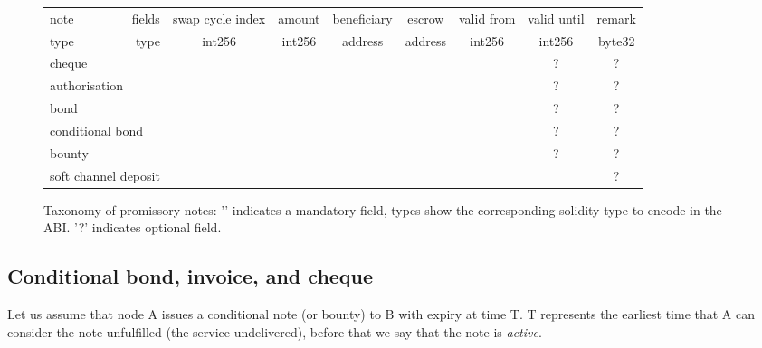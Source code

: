 \newcommand{\tick}{\checkmark}
\newcommand{\opt}{?}
\begin{center}
\begin{figure}
\begin{center}
\begin{tabular}{|l|r||c|c|c|c|c|c|c|}
\hline
note & fields
& swap cycle index
& amount
& beneficiary
& escrow
& valid from
& valid until
& remark
\\
\cline{2-9}

type & type 
& int256
& int256
& address
& address
& int256
& int256
& byte32
\\
\hline
\hline
\multicolumn{2}{|l||}{cheque}   & \tick & \tick & \tick & & & \opt& \opt
\\
\multicolumn{2}{|l||}{authorisation} &  & \tick & \tick & & & \opt& \opt
\\
\multicolumn{2}{|l||}{bond} & \tick & \tick & \tick & & \tick & \opt& \opt
\\
\multicolumn{2}{|l||}{conditional bond} &  & \tick & \tick & \tick & \tick & \opt& \opt
\\
\multicolumn{2}{|l||}{bounty} & \tick &  \tick & & \tick & \tick & \opt& \opt
\\
\multicolumn{2}{|l||}{soft channel deposit} &  \tick & \tick & & & && \opt
\\
\hline
\end{tabular}
\end{center}
\caption{Taxonomy of promissory notes: '\tick' indicates a mandatory field, types show the corresponding solidity type to encode in the ABI. '?' indicates optional field.}
\label{fig:taxonomy}
\end{figure}
\end{center}



\subsection{Conditional bond, invoice, and cheque}

Let us assume that node A issues a conditional note (or bounty) to B with expiry at time T.
T represents the earliest time that A can consider the note unfulfilled (the service undelivered), before
that we say that the note is \emph{active}.

